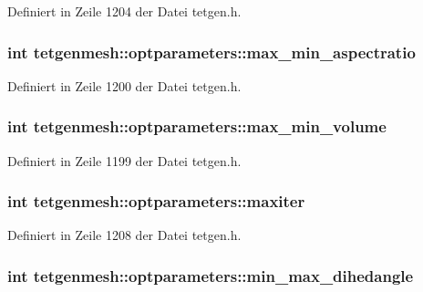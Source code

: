 Definiert in Zeile 1204 der Datei tetgen.\-h.

\hypertarget{classtetgenmesh_1_1optparameters_a844aa0c436ff6021d3c1f7132584faa6}{
\subsubsection[{max\-\_\-min\-\_\-aspectratio}]{\setlength{\rightskip}{0pt plus 5cm}int tetgenmesh\-::optparameters\-::max\-\_\-min\-\_\-aspectratio}}\label{classtetgenmesh_1_1optparameters_a844aa0c436ff6021d3c1f7132584faa6}


Definiert in Zeile 1200 der Datei tetgen.\-h.

\hypertarget{classtetgenmesh_1_1optparameters_ac9adc44bb0076f3b2e5c11c0bf831278}{
\subsubsection[{max\-\_\-min\-\_\-volume}]{\setlength{\rightskip}{0pt plus 5cm}int tetgenmesh\-::optparameters\-::max\-\_\-min\-\_\-volume}}\label{classtetgenmesh_1_1optparameters_ac9adc44bb0076f3b2e5c11c0bf831278}


Definiert in Zeile 1199 der Datei tetgen.\-h.

\hypertarget{classtetgenmesh_1_1optparameters_a0f2b3bd97f2120bdb77acb9e89026196}{
\subsubsection[{maxiter}]{\setlength{\rightskip}{0pt plus 5cm}int tetgenmesh\-::optparameters\-::maxiter}}\label{classtetgenmesh_1_1optparameters_a0f2b3bd97f2120bdb77acb9e89026196}


Definiert in Zeile 1208 der Datei tetgen.\-h.

\hypertarget{classtetgenmesh_1_1optparameters_ab391511f633b84180d0e6cc52510e343}{
\subsubsection[{min\-\_\-max\-\_\-dihedangle}]{\setlength{\rightskip}{0pt plus 5cm}int tetgenmesh\-::optparameters\-::min\-\_\-max\-\_\-dihedangle}}\label{classtetgenmesh_1_1optparameters_ab391511f633b84180d0e6cc52510e343}


